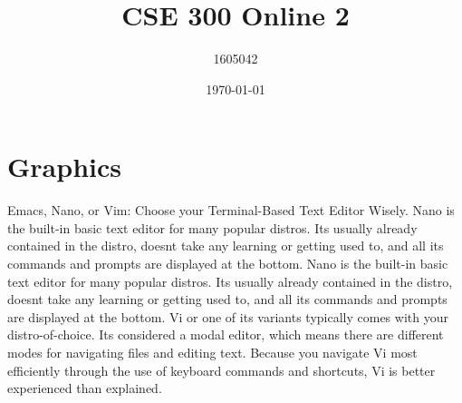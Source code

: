 \documentclass[letter, 12pt]{article}
\author{1605042}
\date{\today}
\title{CSE 300 Online 2}
\begin{document}
	\maketitle 
	\tableofcontents
\section{Graphics}
Emacs, Nano, or Vim: Choose your Terminal-Based Text Editor Wisely. Nano
is the built-in basic text editor for many popular distros. Its usually already
contained in the distro, doesnt take any learning or getting used to, and all
its commands and prompts are displayed at the bottom. Nano is the built-in
basic text editor for many popular distros. Its usually already contained in the
distro, doesnt take any learning or getting used to, and all its commands and
prompts are displayed at the bottom. Vi or one of its variants typically comes
with your distro-of-choice. Its considered a modal editor, which means there
are different modes for navigating files and editing text. Because you navigate
Vi most efficiently through the use of keyboard commands and shortcuts, Vi is
better experienced than explained.
\end{document}
